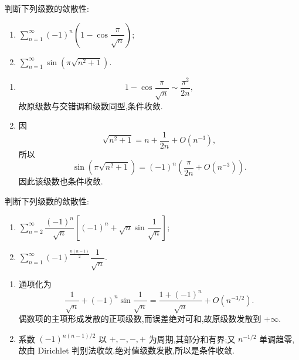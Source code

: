 \begin{example}
    判断下列级数的敛散性:
    \begin{enumerate}
        \item $\displaystyle\sum\limits_{n=1}^{\infty}(-1)^n\left(1-\cos\dfrac{\pi}{\sqrt n}\right)$;
        \item $\displaystyle\sum\limits_{n=1}^{\infty}\sin\left(\pi\sqrt{n^2+1}\right)$.
    \end{enumerate}
\end{example}
\exampleblank

\begin{solution}
    \leavevmode
    \begin{enumerate}
        \item
              \[
                  1-\cos\dfrac{\pi}{\sqrt n}\sim\dfrac{\pi^2}{2n},
              \]
              故原级数与交错调和级数同型,条件收敛.
        \item 因
              \[
                  \sqrt{n^2+1}=n+\dfrac{1}{2n}+O(n^{-3}),
              \]
              所以
              \[
                  \sin\left(\pi\sqrt{n^2+1}\right)
                  =(-1)^n\left(\dfrac{\pi}{2n}+O(n^{-3})\right).
              \]
              因此该级数也条件收敛.
    \end{enumerate}
\end{solution}

\begin{example}
    判断下列级数的敛散性:
    \begin{enumerate}
        \item $\displaystyle\sum\limits_{n=2}^{\infty}\dfrac{(-1)^n}{\sqrt n}
                  \left[(-1)^n+\sqrt n\sin\dfrac{1}{\sqrt n}\right]$;
        \item $\displaystyle\sum\limits_{n=1}^{\infty}(-1)^{\frac{n(n-1)}{2}}\dfrac{1}{\sqrt n}$.
    \end{enumerate}
\end{example}
\exampleblank

\begin{solution}
    \leavevmode
    \begin{enumerate}
        \item 通项化为
              \[
                  \dfrac{1}{\sqrt n}+(-1)^n\sin\dfrac{1}{\sqrt n}
                  =\dfrac{1+(-1)^n}{\sqrt n}+O(n^{-3/2}).
              \]
              偶数项的主项形成发散的正项级数,而误差绝对可和,故原级数发散到 $+\infty$.
        \item 系数 $(-1)^{n(n-1)/2}$ 以 $+,-,-,+$ 为周期,其部分和有界;又 $n^{-1/2}$ 单调趋零,故由 Dirichlet 判别法收敛.绝对值级数发散,所以是条件收敛.
    \end{enumerate}
\end{solution}

